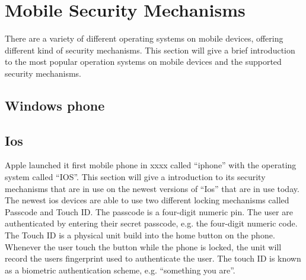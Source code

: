 \clearpage
  \section{Mobile Security Mechanisms}

    There are a variety of different operating systems on mobile devices, offering different kind of security mechanisms. This section will give a brief introduction to the most popular operation systems on mobile devices and the supported security mechanisms.
    

    \subsection{Windows phone}

    \subsection{Ios}

    Apple launched it first mobile phone in xxxx called ``iphone'' with the operating system called ``IOS''. This section will give a introduction to its security mechanisms that are in use on the newest versions of ``Ios'' that are in use today. The newest ios devices are able to use two different locking mechanisms called Passcode and Touch ID. The passcode is a four-digit numeric pin. The user are authenticated by entering their secret passcode, e.g. the four-digit numeric code. The Touch ID is a physical unit build into the home button on the phone. Whenever the user touch the button while the phone is locked, the unit will record the users fingerprint used to authenticate the user. The touch ID is known as a biometric authentication scheme, e.g. ``something you are''.

